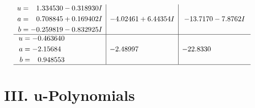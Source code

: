 \documentclass[1p]{elsarticle_modified}
\theoremstyle{definition}
\begin{document}
$$\begin{array}{c|c|c}
\begin{aligned}
u &= \phantom{-}1.334530 - 0.318930 I \\
a &= \phantom{-}0.708845 + 0.169402 I \\
b &= -0.259819 - 0.832925 I\end{aligned}
 & -4.02461 + 6.44354 I & -13.7170 - 7.8762 I \\ \hline\begin{aligned}
u &= -0.463640\phantom{ +0.000000I} \\
a &= -2.15684\phantom{ +0.000000I} \\
b &= \phantom{-}0.948553\phantom{ +0.000000I}\end{aligned}
 & -2.48997\phantom{ +0.000000I} & -22.8330\phantom{ +0.000000I}\\
 \hline 
 \end{array}$$\newpage
\newpage\renewcommand{\arraystretch}{1}
\centering \section*{ III. u-Polynomials}
\end{document}
